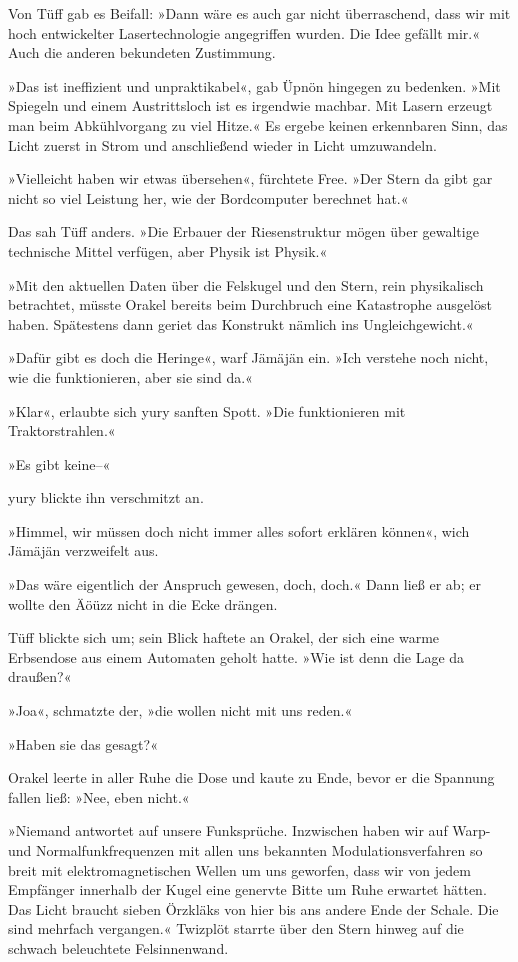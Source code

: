 Von Tüff gab es Beifall: »Dann wäre es auch gar nicht überraschend, dass wir mit hoch entwickelter Lasertechnologie angegriffen wurden. Die Idee gefällt mir.« Auch die anderen bekundeten Zustimmung.

»Das ist ineffizient und unpraktikabel«, gab Üpnön hingegen zu bedenken. »Mit Spiegeln und einem Austrittsloch ist es irgendwie machbar. Mit Lasern erzeugt man beim Abkühlvorgang zu viel Hitze.« Es ergebe keinen erkennbaren Sinn, das Licht zuerst in Strom und anschließend wieder in Licht umzuwandeln.

»Vielleicht haben wir etwas übersehen«, fürchtete Free. »Der Stern da gibt gar nicht so viel Leistung her, wie der Bordcomputer berechnet hat.«

Das sah Tüff anders. »Die Erbauer der Riesenstruktur mögen über gewaltige technische Mittel verfügen, aber Physik ist Physik.«

»Mit den aktuellen Daten über die Felskugel und den Stern, rein physikalisch betrachtet, müsste Orakel bereits beim Durchbruch eine Katastrophe ausgelöst haben. Spätestens dann geriet das Konstrukt nämlich ins Ungleichgewicht.«

»Dafür gibt es doch die Heringe«, warf Jämäjän ein. »Ich verstehe noch nicht, wie die funktionieren, aber sie sind da.«

»Klar«, erlaubte sich yury sanften Spott. »Die funktionieren mit Traktorstrahlen.«

»Es gibt keine–«

yury blickte ihn verschmitzt an.

»Himmel, wir müssen doch nicht immer alles sofort erklären können«, wich Jämäjän verzweifelt aus.

»Das wäre eigentlich der Anspruch gewesen, doch, doch.« Dann ließ er ab; er wollte den Äöüzz nicht in die Ecke drängen.

Tüff blickte sich um; sein Blick haftete an Orakel, der sich eine warme Erbsendose aus einem Automaten geholt hatte. »Wie ist denn die Lage da draußen?«

»Joa«, schmatzte der, »die wollen nicht mit uns reden.«

»Haben sie das gesagt?«

Orakel leerte in aller Ruhe die Dose und kaute zu Ende, bevor er die Spannung fallen ließ: »Nee, eben nicht.«

»Niemand antwortet auf unsere Funksprüche. Inzwischen haben wir auf Warp- und Normalfunkfrequenzen mit allen uns bekannten Modulationsverfahren so breit mit elektromagnetischen Wellen um uns geworfen, dass wir von jedem Empfänger innerhalb der Kugel eine genervte Bitte um Ruhe erwartet hätten. Das Licht braucht sieben Örzkläks von hier bis ans andere Ende der Schale. Die sind mehrfach vergangen.« Twizplöt starrte über den Stern hinweg auf die schwach beleuchtete Felsinnenwand.

